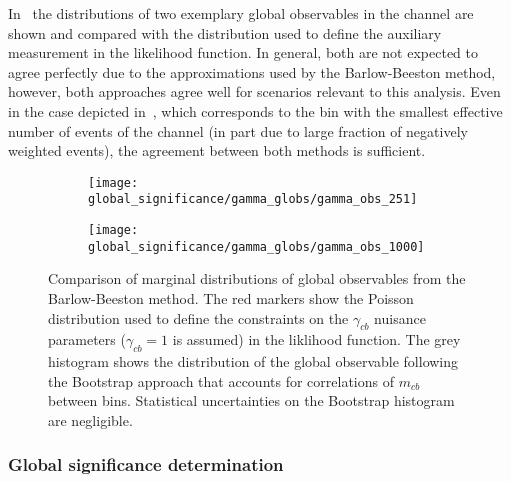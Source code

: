 In~ the distributions of two
exemplary global observables in the \hadhad channel are shown and
compared with the distribution used to define the auxiliary
measurement in the likelihood function. In general, both are not
expected to agree perfectly due to the approximations used by the
Barlow-Beeston method, however, both approaches agree well for
scenarios relevant to this analysis. Even in the case depicted
in~, which
corresponds to the bin with the smallest effective number of events of
the \hadhad channel (in part due to large fraction of negatively
weighted events), the agreement between both methods is sufficient.

\begin{figure}[htbp]
  \centering

  \begin{subfigure}{0.485\textwidth}
    \centering

    \texttt{[image: global\_significance/gamma\_globs/gamma\_obs\_251]}
    \label{fig:comparison_bootstrap_poisson_lowest_tau}
  \end{subfigure}\hfill%
  \begin{subfigure}{0.485\textwidth}
    \centering

    \texttt{[image: global\_significance/gamma\_globs/gamma\_obs\_1000]}
  \end{subfigure}

  \caption{Comparison of marginal distributions of global observables
    from the Barlow-Beeston method. The red markers show the Poisson
    distribution used to define the constraints on the $\gamma_{cb}$
    nuisance parameters ($\gamma_{cb} = 1$ is assumed) in the
    liklihood function. The grey histogram shows the distribution of
    the global observable following the Bootstrap approach that
    accounts for correlations of $m_{cb}$ between bins. Statistical
    uncertainties on the Bootstrap histogram are negligible.}
  \label{fig:comparison_bootstrap_poisson}
\end{figure}


\subsubsection{Global significance determination}

